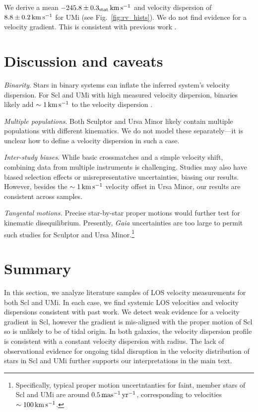 We derive a mean \(-245.8\pm0.3_{\rm stat}\,{\rm km\,s^{-1}}\) and velocity
dispersion of \(8.8\pm0.2\,{\rm km\,s^{-1}}\) for UMi (see Fig.~\ref{fig:rv_hists}).
We do not find evidence for a velocity gradient. This is consistent with
previous work \citetext{\citealp{pace+2020}; \citealp[somewhat
with][]{spencer+2018}; \citealp{martinez-garcia+2023}}.

\section{Discussion and caveats}\label{discussion-and-caveats}

\emph{Binarity}. Stars in binary systems can inflate the inferred
system's velocity dispersion. For Scl and UMi with high measured
velocity dispersion, binaries likely add \(\sim 1\,{\rm km\,s^{-1}}\) to the
velocity dispersion \citep{spencer+2018, gration+2025}.

\emph{Multiple populations}. Both Sculptor and Ursa Minor likely contain
multiple populations with different kinematics\citep[\citet{pace+2020},
\citet{tolstoy+2004}]{arroyo-polonio+2024}. We do not model these
separately---it is unclear how to define a velocity dispersion in such a
case.

\emph{Inter-study biases}. While basic crossmatches and a simple
velocity shift, combining data from multiple instruments is challenging.
Studies may also have biased selection effects or misrepresentative
uncertainties, biasing our results. However, besides the \(\sim1\,{\rm km\,s^{-1}}\)
velocity offset in Ursa Minor, our results are consistent across
samples.

\emph{Tangental motions.} Precise star-by-star proper motions would
further test for kinematic disequilibrium. Presently, \emph{Gaia}
uncertainties are too large to permit such studies for Sculptor and Ursa
Minor.\footnote{Specifically, typical proper motion uncertntanties for
  faint, member stars of Scl and UMi are around \(0.5\,{\rm mas^{-1}\,yr^{-1}}\),
  corresponding to velocities \(\sim 100\,{\rm km\,s^{-1}}\).}

\section{Summary}\label{summary}

In this section, we analyze literature samples of LOS velocity
measurements for both Scl and UMi. In each case, we find systemic LOS
velocities and velocity dispersions consistent with past work. We detect
weak evidence for a velocity gradient in Scl, however the gradient is
mis-aligned with the proper motion of Scl so is unlikely to be of tidal
origin. In both galaxies, the velocity dispersion profile is consistent
with a constant velocity dispersion with radius. The lack of
observational evidence for ongoing tidal disruption in the velocity
distribution of stars in Scl and UMi further supports our
interpretations in the main text.
